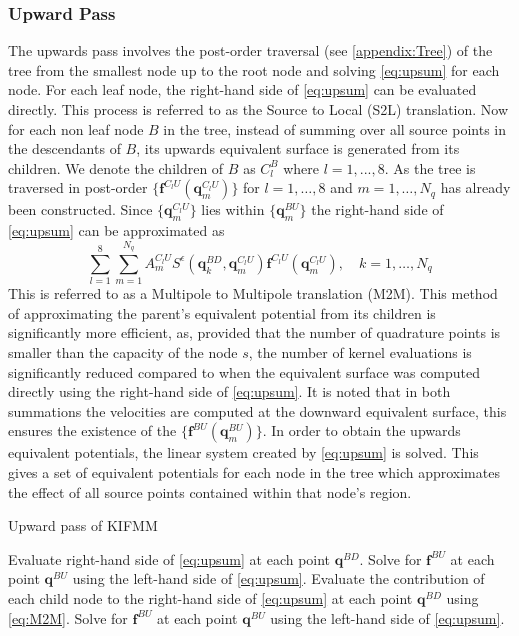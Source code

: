 \subsubsection{Upward Pass}
The upwards pass involves the post-order traversal (see \cref{appendix:Tree}) of the tree from the smallest node up to the root node and solving \cref{eq:upsum} for each node. For each leaf node, the right-hand side of \cref{eq:upsum} can be evaluated directly. This process is referred to as the Source to Local (S2L) translation.  Now for each non leaf node $B$ in the tree, instead of summing over all source points in the descendants of $B$, its upwards equivalent surface is generated from its children. We denote the children of $B$ as $C_l^B$ where $l=1,...,8$. As the tree is traversed in post-order $\{\bm{f}^{C_l U}(\bm{q}^{C_lU}_m)\}$ for $l=1,\dots,8$ and $m=1,\dots,N_q$ has already been constructed. Since $\{\bm{q}^{C_lU}_m\}$ lies within $\{\bm{q}^{BU}_m\}$ the right-hand side of \cref{eq:upsum} can be approximated as
\begin{equation}
\label{eq:M2M}
    \sum_{l=1}^{8} \sum_{m=1}^{N_{q}} A_{m}^{C_{l} U} S^\epsilon\left(\bm{q}_{k}^{B D}, \bm{q}_{m}^{C_{l} U}\right) \bm{f}^{C_{l} U}\left(\bm{q}_{m}^{C_{l} U}\right), \quad k=1,\dots,N_q
\end{equation}
This is referred to as a Multipole to Multipole translation (M2M). This method of approximating the parent's equivalent potential from its children is significantly more efficient, as, provided that the number of quadrature points is smaller than the capacity of the node $s$, the number of kernel evaluations is significantly reduced compared to when the equivalent surface was computed directly using the right-hand side of \cref{eq:upsum}. It is noted that in both summations the velocities are  computed at the downward equivalent surface, this ensures the existence of the $\{\bm{f}^{BU}(\bm{q}^{BU}_m)\}$. In order to obtain the upwards equivalent potentials, the linear system created by \cref{eq:upsum} is solved. This gives a set of equivalent potentials for each node in the tree which approximates the effect of all source points contained within that node's region.

\begin{algorithm}
\caption{Upward pass of KIFMM}\label{alg:UpKIFMM}
\begin{algorithmic}
\State Evaluate right-hand side of \cref{eq:upsum} at each point $\bm{q}^{BD}$.
\State Solve for $\bm{f}^{BU}$ at each point $\bm{q}^{BU}$ using the left-hand side of \cref{eq:upsum}.
\EndFor
{}
\State Evaluate the contribution of each child node to the right-hand side of \cref{eq:upsum} 
\State \quad at each point $\bm{q}^{BD}$ using \cref{eq:M2M}.
\State Solve for $\bm{f}^{BU}$ at each point $\bm{q}^{BU}$ using the left-hand side of \cref{eq:upsum}.
\EndFor
\end{algorithmic}
\end{algorithm}

